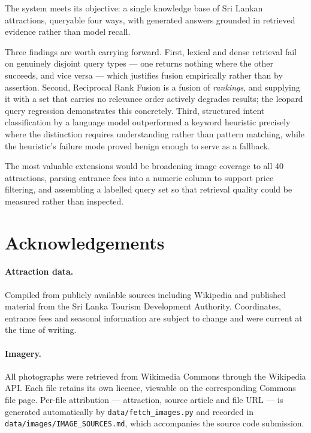 \documentclass[11pt,a4paper]{article}
\begin{document}
The system meets its objective: a single knowledge base of Sri Lankan
attractions, queryable four ways, with generated answers grounded in retrieved
evidence rather than model recall.

Three findings are worth carrying forward. First, lexical and dense retrieval
fail on genuinely disjoint query types --- one returns nothing where the other
succeeds, and vice versa --- which justifies fusion empirically rather than by
assertion. Second, Reciprocal Rank Fusion is a fusion of \emph{rankings}, and
supplying it with a set that carries no relevance order actively degrades
results; the leopard query regression demonstrates this concretely. Third,
structured intent classification by a language model outperformed a keyword
heuristic precisely where the distinction requires understanding rather than
pattern matching, while the heuristic's failure mode proved benign enough to
serve as a fallback.

The most valuable extensions would be broadening image coverage to all 40
attractions, parsing entrance fees into a numeric column to support price
filtering, and assembling a labelled query set so that retrieval quality could
be measured rather than inspected.

\section*{Acknowledgements}

\paragraph{Attraction data.} Compiled from publicly available sources including
Wikipedia and published material from the Sri Lanka Tourism Development
Authority. Coordinates, entrance fees and seasonal information are subject to
change and were current at the time of writing.

\paragraph{Imagery.} All photographs were retrieved from Wikimedia Commons
through the Wikipedia API. Each file retains its own licence, viewable on the
corresponding Commons file page. Per-file attribution --- attraction, source
article and file URL --- is generated automatically by
\texttt{data/fetch\_images.py} and recorded in
\texttt{data/images/IMAGE\_SOURCES.md}, which accompanies the source code
submission.
\end{document}
